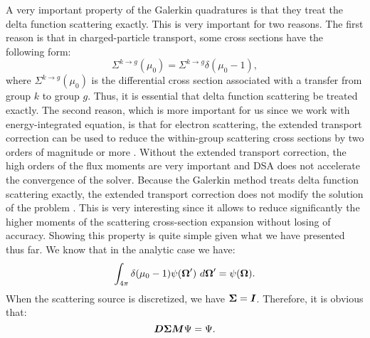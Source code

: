 A very important property of the Galerkin quadratures is that they treat the
delta function scattering exactly. This is very important for two reasons. 
The first reason is that in charged-particle transport, some cross sections 
have the following form:
\begin{equation}
\Sigma^{k\rightarrow g}(\mu_0) = \Sigma^{k\rightarrow g} \delta(\mu_0-1),
\end{equation}
where $\Sigma^{k\rightarrow g}(\mu_0)$ is the differential cross section
associated with a transfer from group $k$ to group $g$. Thus, it is essential
that delta function scattering be treated exactly. The second reason, which is
more important for us since we work with energy-integrated equation, is that for 
electron scattering, the extended transport correction \cite{lathrop} can be 
used to reduce the within-group scattering cross sections by two orders of 
magnitude or more \cite{morel_79}. Without the extended transport correction, 
the high orders of the flux moments are very important and DSA does not 
accelerate the convergence of the solver. Because the Galerkin method treats 
delta function  scattering exactly, the extended transport correction does not
modify the solution of the problem \cite{morel_79}. This is very interesting 
since it allows to reduce significantly the higher moments of the scattering
cross-section expansion without losing of accuracy. Showing this property is
quite simple given what we have presented thus far. We know that in the analytic case
we have:
\begin{equation}
\int_{4\pi} \delta(\mu_0-1) \psi(\boldsymbol{\Omega}')\ d\boldsymbol{\Omega}' = \psi(\boldsymbol{\Omega}).
\end{equation}
When the scattering source is discretized, we have $\boldsymbol{\Sigma}=\boldsymbol{I}$.
Therefore, it is obvious that:
\begin{equation}
  \boldsymbol{D\Sigma M}\Psi = \Psi.
\end{equation}


